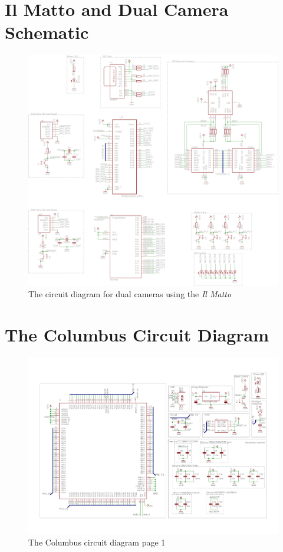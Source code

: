 \section{Il Matto and Dual Camera Schematic}\label{sch:IlMatto:Cameras}
\begin{figure}[ht!]
\centering
\includegraphics[angle = 90, width=\textwidth,height=\textheight,keepaspectratio]{Figures/IlMattoCamera_CircuitDiagram.png} 
\caption{The circuit diagram for dual cameras using the \textit{Il Matto}}
\label{sch:DualCam_Schematic}
\end{figure}
\clearpage

\section{The Columbus Circuit Diagram} \label{sch:Columbus:CircuitDiagram}
\begin{figure}[ht!]
\centering
\includegraphics[angle = 90, width=\textwidth,height=\textheight,keepaspectratio]{./Figures/ColumbusCircuitPage1.pdf}
\caption{The Columbus circuit diagram page 1}
\label{sch:Columbus_Schematic:1}
\end{figure}

